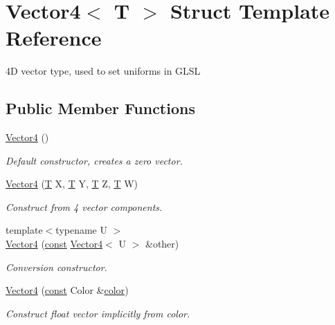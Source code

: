 \hypertarget{struct_vector4}{\section{Vector4$<$ T $>$ Struct Template Reference}
\label{struct_vector4}
}


4\-D vector type, used to set uniforms in G\-L\-S\-L  


\subsection*{Public Member Functions}
\begin{DoxyCompactItemize}
\item 
\hyperlink{struct_vector4_afdef97d94e5697622b5322637028accf}{Vector4} ()
\begin{DoxyCompactList}\small\item\em Default constructor, creates a zero vector. \end{DoxyCompactList}\item 
\hyperlink{struct_vector4_ae099ed0a6d7d78ed38ac023d0e4cec25}{Vector4} (\hyperlink{curses_8priv_8h_a5ef253115820acf7d27f3c5c3b02a0f0}{T} X, \hyperlink{curses_8priv_8h_a5ef253115820acf7d27f3c5c3b02a0f0}{T} Y, \hyperlink{curses_8priv_8h_a5ef253115820acf7d27f3c5c3b02a0f0}{T} Z, \hyperlink{curses_8priv_8h_a5ef253115820acf7d27f3c5c3b02a0f0}{T} W)
\begin{DoxyCompactList}\small\item\em Construct from 4 vector components. \end{DoxyCompactList}\item 
{\footnotesize template$<$typename U $>$ }\\\hyperlink{struct_vector4_a6413d8b504d7fdfbb600a0caf9c90cc2}{Vector4} (\hyperlink{term__entry_8h_a57bd63ce7f9a353488880e3de6692d5a}{const} \hyperlink{struct_vector4}{Vector4}$<$ U $>$ \&other)
\begin{DoxyCompactList}\small\item\em Conversion constructor. \end{DoxyCompactList}\item 
\hyperlink{struct_vector4_af1da65a743ddbb5c779b41eae766c00d}{Vector4} (\hyperlink{term__entry_8h_a57bd63ce7f9a353488880e3de6692d5a}{const} Color \&\hyperlink{_entity_8cpp_a864889304a90873adb9c6e289a54bcf4}{color})
\begin{DoxyCompactList}\small\item\em Construct float vector implicitly from color. \end{DoxyCompactList}\end{DoxyCompactItemize}
